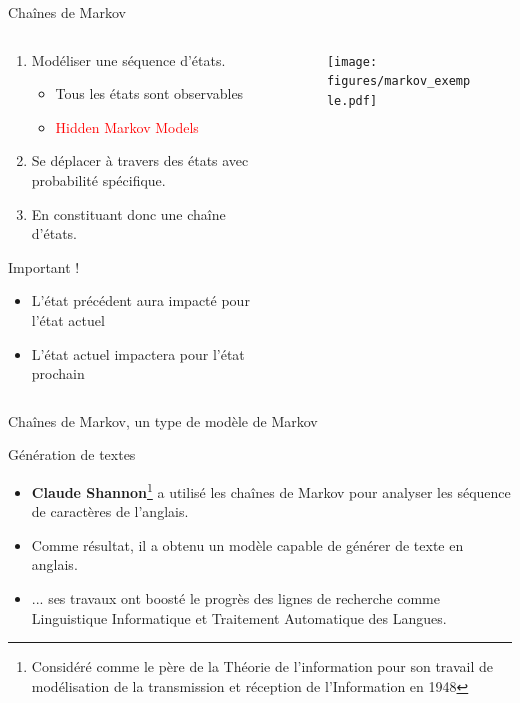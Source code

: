 \documentclass[aspectratio=169,xcolor=dvipsnames, t]{beamer}
\begin{document}
\begin{frame}{Chaînes de Markov}
	
	\begin{columns}
		\begin{column}{0.70\textwidth}
			\begin{enumerate}
				\item Modéliser une séquence d'états.
				\begin{itemize}
					\item Tous les états sont observables
					\item \textcolor{red}{Hidden Markov Models}
				\end{itemize}
				\item Se déplacer à travers des états avec probabilité spécifique.
				\item En constituant donc une chaîne d'états.
			\end{enumerate}
		
			\begin{alertblock}{Important !}
				\begin{itemize}
					\item L'état précédent aura impacté pour l'état actuel
					\item L'état actuel impactera pour l'état prochain
				\end{itemize}
			\end{alertblock}			

		\end{column}
		\begin{column}{0.28\textwidth}
			\begin{figure}
				\texttt{[image: figures/markov\_exemple.pdf]}
			\end{figure}
		\end{column}
	\end{columns}
	

\end{frame}


\begin{frame}{Chaînes de Markov, un type de modèle de Markov}
	
	
	
	\begin{block}{Génération de textes}
		\begin{itemize}
			\item \textbf{Claude Shannon}\footnote{Considéré comme le père de la Théorie de l'information pour son travail de modélisation de la transmission et réception de l'Information en 1948} a utilisé les chaînes de Markov pour analyser les séquence de caractères de l'anglais.
			\item Comme résultat, il a obtenu un modèle capable de générer de texte en anglais.
			\item ... ses travaux ont boosté le progrès des lignes de recherche comme Linguistique Informatique et Traitement Automatique des Langues.
		\end{itemize}
		
	\end{block}
	
\end{frame}
\end{document}

